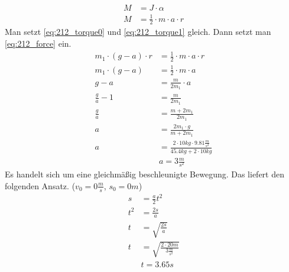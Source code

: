 \documentclass{article}
\begin{document}
	\begin{align}
		M&=J\cdot\alpha	\nonumber\\
		M&=\frac{1}{2}\cdot m\cdot a\cdot r	\label{eq:212_torque1}
	\end{align}
	Man setzt \eqref{eq:212_torque0} und \eqref{eq:212_torque1} gleich. Dann setzt man \eqref{eq:212_force} ein.
	\begin{align*}
		m_1\cdot(g-a)\cdot r&=\frac{1}{2}\cdot m\cdot a\cdot r\\
		m_1\cdot(g-a)&=\frac{1}{2}\cdot m\cdot a\\
		g-a&=\frac{m}{2m_1}\cdot a\\
		\frac{g}{a}-1&=\frac{m}{2m_1}\\
		\frac{g}{a}&=\frac{m+2m_1}{2m_1}\\
		a&=\frac{2m_1\cdot g}{m+2m_1}\\
		a&=\frac{2\cdot10kg\cdot9.81\frac{m}{s^2}}{45.4kg+2\cdot10kg}\\
		&\boxed{a=3\frac{m}{s^2}}	\tag{a}	\label{eq:212_a}
	\end{align*}
	Es handelt sich um eine gleichmäßig beschleunigte Bewegung. Das liefert den folgenden Ansatz. ($v_0=0\frac{m}{s}$, $s_0=0m$)
	\begin{align*}
		s&=\frac{a}{2}t^2\\
		t^2&=\frac{2s}{a}\\
		t&=\sqrt{\frac{2s}{a}}\\
		t&=\sqrt{\frac{2\cdot20m}{3\frac{m}{s^2}}}\\
		&\boxed{t=3.65s}	\tag{b}	\label{eq:212_b}
	\end{align*}
	\newpage
	
\end{document}
